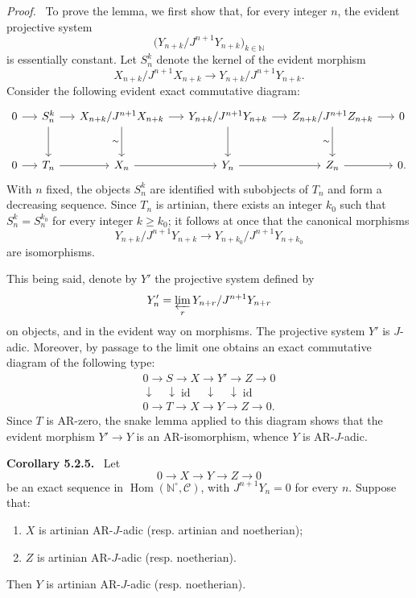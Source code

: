 \documentclass[11pt]{article}
\newenvironment{statement}[1]{\par\medskip\noindent\textbf{#1.}\ }{\par\medskip}
\newenvironment{prooftext}[1][Proof]{\par\noindent\emph{#1.}\ }{\par\medskip}
\DeclareMathOperator{\Hom}{Hom}
\providecommand{\id}{\operatorname{id}}
\providecommand{\Hom}{\operatorname{Hom}}
\providecommand{\id}{\operatorname{id}}
\providecommand{\id}{\operatorname{id}}
\providecommand{\id}{\operatorname{id}}
\providecommand{\id}{\operatorname{id}}
\providecommand{\Hom}{\operatorname{Hom}}
\providecommand{\id}{\operatorname{id}}
\begin{document}
\begin{prooftext}
To prove the lemma, we first show that, for every integer \(n\), the evident projective system
\[
\bigl(Y_{n+k}/J^{n+1}Y_{n+k}\bigr)_{k\in\mathbb N}
\]
is essentially constant. Let \(S_n^k\) denote the kernel of the evident morphism
\[
X_{n+k}/J^{n+1}X_{n+k}\longrightarrow
Y_{n+k}/J^{n+1}Y_{n+k}.
\]
Consider the following evident exact commutative diagram:
\[
\begin{tikzcd}[column sep=1.35em,row sep=large]
0 \arrow[r] & S_n^k \arrow[r] \arrow[d] & X_{n+k}/J^{n+1}X_{n+k} \arrow[r] \arrow[d,"\sim"'] & Y_{n+k}/J^{n+1}Y_{n+k} \arrow[r] \arrow[d] & Z_{n+k}/J^{n+1}Z_{n+k} \arrow[r] \arrow[d,"\sim"'] & 0\\
0 \arrow[r] & T_n \arrow[r] & X_n \arrow[r] & Y_n \arrow[r] & Z_n \arrow[r] & 0 .
\end{tikzcd}
\]
With \(n\) fixed, the objects \(S_n^k\) are identified with subobjects of \(T_n\) and form a decreasing sequence. Since \(T_n\) is artinian, there exists an integer \(k_0\) such that \(S_n^k=S_n^{k_0}\) for every integer \(k\ge k_0\); it follows at once that the canonical morphisms
\[
Y_{n+k}/J^{n+1}Y_{n+k}
\longrightarrow
Y_{n+k_0}/J^{n+1}Y_{n+k_0}
\]
are isomorphisms.

This being said, denote by \(Y'\) the projective system defined by
\[
Y'_n=\varprojlim_r Y_{n+r}/J^{n+1}Y_{n+r}
\]
on objects, and in the evident way on morphisms. The projective system \(Y'\) is \(J\)-adic. Moreover, by passage to the limit one obtains an exact commutative diagram of the following type:
\[
\begin{array}{ccccc}
0\to S\to X\to Y'\to Z\to0\\
\downarrow\quad\downarrow\id\quad\downarrow\quad\downarrow\id\\
0\to T\to X\to Y\to Z\to0 .
\end{array}
\]
Since \(T\) is AR-zero, the snake lemma applied to this diagram shows that the evident morphism \(Y'\to Y\) is an AR-isomorphism, whence \(Y\) is AR-\(J\)-adic.
\end{prooftext}

\label{sga5:V:corollary:5.2.5}\begin{statement}{Corollary 5.2.5}
Let
\[
0\longrightarrow X\longrightarrow Y\longrightarrow Z\longrightarrow0
\]
be an exact sequence in \(\Hom(\mathbb N^\circ,\mathcal C)\), with \(J^{n+1}Y_n=0\) for every \(n\). Suppose that:
\begin{enumerate}[label=\textup{(\roman*)}]
\item \(X\) is artinian AR-\(J\)-adic (resp. artinian and noetherian);
\item \(Z\) is artinian AR-\(J\)-adic (resp. noetherian).
\end{enumerate}
Then \(Y\) is artinian AR-\(J\)-adic (resp. noetherian).
\end{statement}
\end{document}
